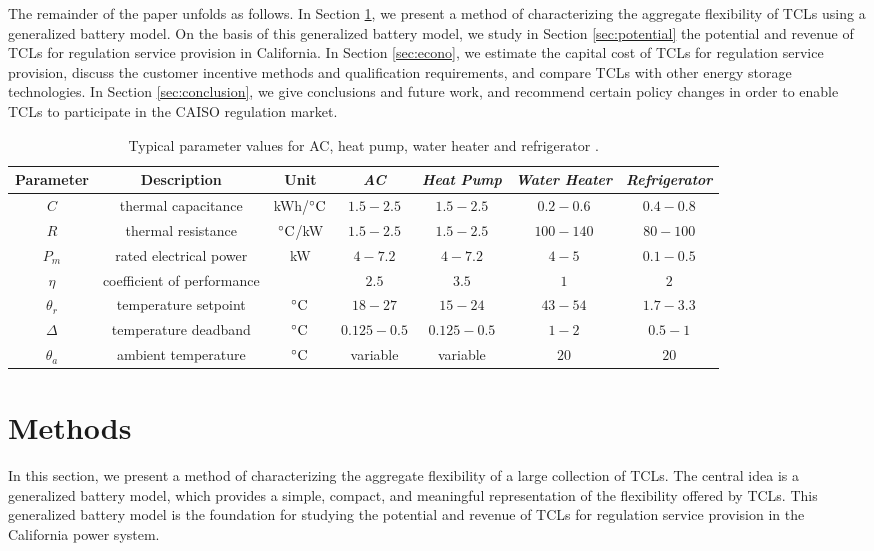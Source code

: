 \documentclass[onecolumn,journal]{IEEEtran}
\begin{document}
The remainder of the paper unfolds as follows. In Section \ref{sec:flexibility}, we present a method of characterizing the aggregate flexibility of \acp{TCL} using a generalized battery model. On the basis of this generalized battery model, we study in Section \ref{sec:potential} the potential and revenue of \acp{TCL} for regulation service provision in California. In Section \ref{sec:econo}, we estimate the capital cost of \acp{TCL} for regulation service provision, discuss the customer incentive methods and qualification requirements, and compare \acp{TCL} with other energy storage technologies. In Section \ref{sec:conclusion}, we give conclusions and future work, and recommend certain policy changes in order to enable \acp{TCL} to participate in the CAISO regulation market.



\begin{table*}[tb]
\caption{Typical parameter values for AC, heat pump, water heater and refrigerator  \cite{mathieu_revenue}.}
{\scriptsize
\label{tab:model_parameters}
\begin{center}
\begin{tabular}{ccccccc}
\hline
Parameter & Description & Unit & \emph{AC} &  \emph{Heat Pump} &  \emph{Water Heater} &  \emph{Refrigerator} \\
\hline 
$C$ & thermal capacitance  & kWh/$^{\circ}{\rm C}$ & $1.5-2.5$ &$1.5-2.5$ & $0.2-0.6$ &$0.4-0.8$\\
$R$ & thermal resistance  & $^{\circ}{\rm C}$/kW &  $1.5-2.5$ & $1.5-2.5$& $100-140$& $80-100$\\
$P_m$ & rated electrical power  & kW &   $4-7.2$& $4-7.2$ & $4-5$& $0.1-0.5$\\
$\eta$ & coefficient of performance  &  & $2.5$& $3.5$ & $1$ & $2$\\
$\theta_r$ & temperature setpoint  &$^{\circ}{\rm C}$ & $18-27$ &$15-24$ & $43-54$ & $1.7-3.3$\\
$\Delta$ & temperature deadband  & $^{\circ}{\rm C}$ & $0.125-0.5$ & $0.125-0.5$& $1-2$& $0.5-1$\\
$\theta_a$ & ambient temperature & $^{\circ}{\rm C}$ & variable & variable& $20$& $20$\\
\hline
\end{tabular}
\end{center}
}
\end{table*}

\section{Methods}
\label{sec:flexibility}
In this section, we present a method of characterizing the aggregate flexibility of a large collection of \acp{TCL}. The central idea is a generalized battery model, which provides a simple, compact, and meaningful representation of the flexibility offered by \acp{TCL}. This generalized battery model is the foundation for studying the potential and revenue of \acp{TCL} for regulation service provision in the California power system. 
\end{document}

